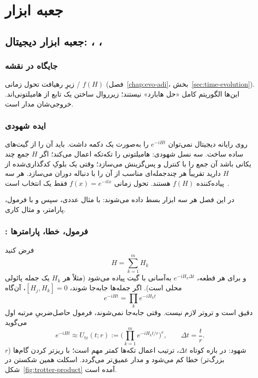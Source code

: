 

\part{جعبه ابزار}

\chapter{جعبه ابزار دیجیتال: ، ، }
\label{chap:digital-tools}

\section{جایگاه در نقشه}

زیرِ رهیافت تحول زمانی / $f(H)$ (فصل~\ref{chap:evo-adi}، بخش~\ref{sec:time-evolution}). این‌ها الگوریتم کامل «حل هابارد» نیستند؛ زیرروال ساختن یک تابع از هامیلتونی‌اند. خروجی‌شان مدار است.

\section{ایده شهودی}

روی رایانه دیجیتال نمی‌توان $e^{-iHt}$ را به‌صورت یک دکمه داشت. باید آن را از گیت‌های ساده ساخت. سه نسل شهودی:  هامیلتونی را تکه‌تکه اعمال می‌کند؛  اگر $H$ جمع چند یکانی باشد آن جمع را با کنترل و پس‌گزینش می‌سازد؛  وقتی یک بلوکِ کدگذاری‌شده از $H$ دارید تقریباً هر چندجمله‌ای مناسب از آن را با دنباله دوران می‌سازد. هر سه پیاده‌کننده $f(H)$ هستند. تحول زمانی $f(x)=e^{-itx}$ فقط یک انتخاب است~\cite{Childs2018,Berry2015,Low2017}.

در این فصل هر سه ابزار بسط داده می‌شوند:  با مثال عددی، سپس  و  با فرمول، پارامتر، و مثال کاری.

\section{: فرمول، خطا، پارامترها}
\label{sec:trotter}

فرض کنید
\begin{equation}
	H=\sum_{k=1}^{m} H_k
\end{equation}
و برای هر قطعه، $e^{-iH_k\Delta t}$ به‌آسانی با گیت پیاده می‌شود (مثلاً هر $H_k$ یک جمله پائولی محلی است). اگر جمله‌ها جابه‌جا شوند، $[H_j,H_k]=0$، آن‌گاه
\begin{equation}
	e^{-iHt}=\prod_k e^{-iH_k t}
\end{equation}
دقیق است و تروتر لازم نیست. وقتی جابه‌جا نمی‌شوند، فرمول حاصل‌ضربیِ مرتبه اول می‌گوید~\cite{Childs2018}
\begin{equation}
	\label{eq:trotter1}
	e^{-iHt}
	\approx
	U_{\mathrm{tr}}(t;r)
	:=
	\Biggl(\prod_{k=1}^{m} e^{-iH_k t/r}\Biggr)^{r},
	\qquad
	\Delta t=\frac{t}{r}.
\end{equation}
شهود: در بازه کوتاه $\Delta t$، ترتیب اعمال تکه‌ها کمتر مهم است؛ با ریزتر کردن گام‌ها ($r$ بزرگ‌تر) خطا کم می‌شود و مدار عمیق‌تر می‌گردد. اسکلت همین شکستن در شکل~\ref{fig:trotter-product} آمده است.

